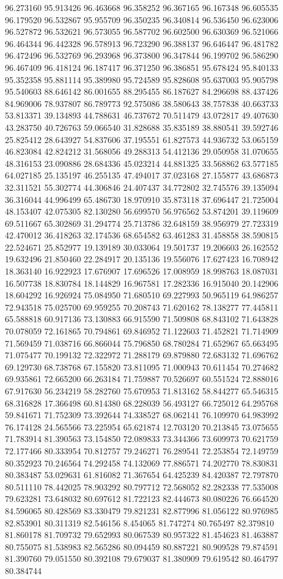 96.273160
95.913426
96.463668
96.358252
96.367165
96.167348
96.605535
96.179520
96.532867
95.955709
96.350235
96.340814
96.536450
96.623006
96.527872
96.532621
96.573055
96.587702
96.602500
96.630369
96.521066
96.464344
96.442328
96.578913
96.723290
96.388137
96.646447
96.481782
96.472496
96.532769
96.293968
96.373800
96.347844
96.199702
96.586290
96.467409
96.418124
96.187417
96.371250
96.386851
95.678424
95.840133
95.352358
95.881114
95.389980
95.724589
95.828608
95.637003
95.905798
95.540603
88.646142
86.001655
88.295455
86.187627
84.296698
88.437426
84.969006
78.937807
86.789773
92.575086
38.580643
38.757838
40.663733
53.813371
39.134893
44.788631
46.737672
70.511479
43.072817
49.407630
43.283750
40.726763
59.066540
31.828688
35.835189
38.880541
39.592746
25.825412
28.643927
54.837606
37.195551
61.827573
44.936732
53.065159
46.823084
42.824212
31.568056
49.288313
54.412136
29.050958
31.070655
48.316153
23.090886
28.684336
45.023214
44.881325
33.568862
63.577185
64.027185
25.135197
46.255135
47.494017
37.023168
27.155877
43.686873
32.311521
55.302774
44.306846
24.407437
34.772802
32.745576
39.135094
36.316044
44.996499
65.486730
18.970910
35.873118
37.696447
21.725004
48.153407
42.075305
82.130280
56.699570
56.976562
53.874201
39.119609
69.511667
65.302869
31.294774
25.713786
32.648159
38.956979
27.723319
42.470012
36.418263
32.174536
68.654582
63.461283
31.458858
38.590815
22.524671
25.852977
19.139189
30.033064
19.501737
19.206603
26.162552
19.632496
21.850460
22.284917
20.135136
19.556076
17.627423
16.708942
18.363140
16.922923
17.676907
17.696526
17.008959
18.998763
18.087031
16.507738
18.830784
18.144829
16.967581
17.282336
16.915040
20.142906
18.604292
16.926924
75.084950
71.680510
69.227993
50.965119
64.986257
72.943518
75.025700
69.959255
70.208743
71.620162
78.138277
77.445811
65.588818
60.917136
73.130883
66.915590
71.509808
68.843102
71.643828
70.078059
72.161865
70.794861
69.846952
71.122603
71.452821
71.714909
71.569459
71.038716
66.866044
75.796850
68.780284
71.652967
65.663495
71.075477
70.199132
72.322972
71.288179
69.879880
72.683132
71.696762
69.129730
68.738768
67.155820
73.811095
71.000943
70.611454
70.274682
69.935861
72.665200
66.263184
71.759887
70.526697
60.551524
72.888016
67.917630
56.234219
58.282760
75.670953
71.813162
58.844277
65.546315
68.316828
17.366498
60.814380
68.228039
56.493127
66.725012
64.295768
59.841671
71.752309
73.392644
74.338527
68.062141
76.109970
64.983992
76.174128
24.565566
73.225954
65.621874
12.703120
70.213845
73.075655
71.783914
81.390563
73.154850
72.089833
73.344366
73.609973
70.621759
72.177466
80.333954
70.812757
79.246271
76.289541
72.253854
72.149759
80.352923
70.246564
74.292458
74.132069
77.886571
74.202770
78.830831
80.383487
53.029631
61.816082
71.367654
64.425239
84.420387
72.797870
80.511110
78.442025
78.903292
80.797712
72.568052
82.282338
77.535008
79.623281
73.648032
80.697612
81.722123
82.444673
80.080226
76.664520
84.596065
80.428569
83.330479
79.821231
82.877996
81.056122
80.976985
82.853901
80.311319
82.546156
8.454065
81.747274
80.765497
82.379810
81.860178
81.709732
79.652993
80.067539
80.957322
81.454623
81.463887
80.755075
81.538983
82.565286
80.094459
80.887221
80.909528
79.874591
81.390760
79.051550
80.392108
79.679037
81.380909
79.619542
80.464797
80.384744
